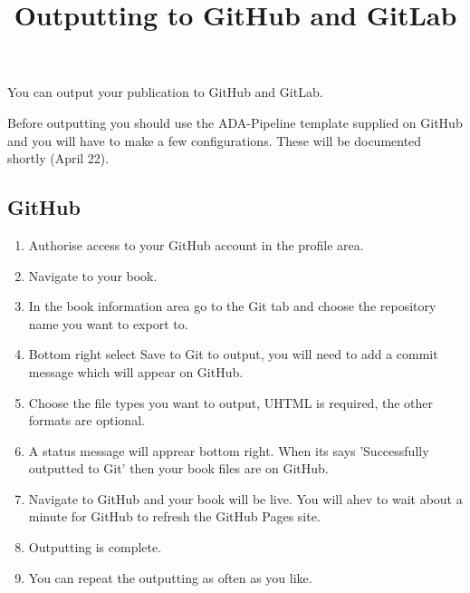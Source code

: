 \documentclass{article}
\begin{document}
\title{Outputting to GitHub and GitLab}

\maketitle


You can output your publication to GitHub and GitLab.


Before outputting you should use the ADA-Pipeline template supplied on GitHub and you will have to make a few configurations. These will be documented shortly (April 22).


\subsection{GitHub}\label{H165647}


\begin{enumerate}
\item Authorise access to your GitHub account in the profile area.


\item Navigate to your book.


\item In the book information area go to the Git tab and choose the repository name you want to export to.


\item Bottom right select Save to Git to output, you will need to add a commit message which will appear on GitHub.


\item Choose the file types you want to output, UHTML is required, the other formats are optional.


\item A status message will apprear bottom right. When its says 'Successfully outputted to Git' then your book files are on GitHub.


\item Navigate to GitHub and your book will be live. You will ahev to wait about a minute for GitHub to refresh the GitHub Pages site.


\item Outputting is complete.


\item You can repeat the outputting as often as you like.


\end{enumerate}
\end{document}
